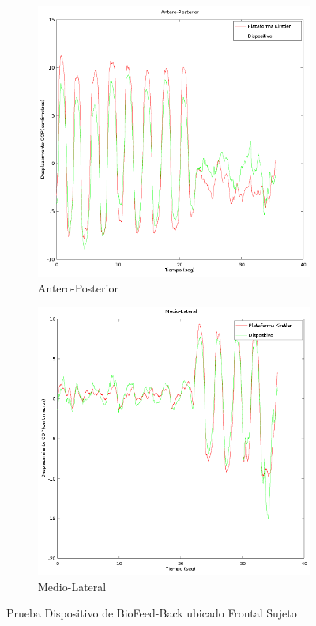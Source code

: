 \documentclass[12pt,a4paper]{article}
\newcommand{\nombreDispositivo}{Dispositivo de BioFeed-Back }
\begin{document}
	\begin{figure}[H]
		\centering
		\begin{subfigure}{.5\textwidth}
			\centering
			\includegraphics[width=1\linewidth]{images/pruebas/Frontal/Antero-Posterior}
			\caption{Antero-Posterior}
			\label{fig:anteroPosterioFrontal}
		\end{subfigure}%
		\begin{subfigure}{.5\textwidth}
			\centering
			\includegraphics[width=1\linewidth]{images/pruebas/Frontal/Medio-Lateral}
			\caption{Medio-Lateral}
			\label{fig:medioLateralFrontal}
		\end{subfigure}
		\caption{Prueba \nombreDispositivo ubicado Frontal Sujeto}
		\label{fig:pruebaLateralFrontal}
	\end{figure}
	
\end{document}
